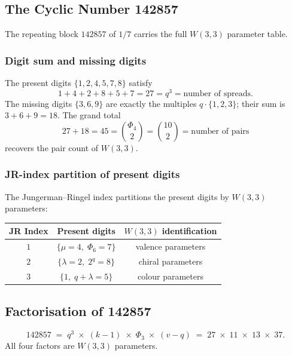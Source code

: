 \subsection{The Cyclic Number 142857}

The repeating block $142857$ of $1/7$ carries the full $W(3,3)$ parameter table.

\subsubsection*{Digit sum and missing digits}

The present digits $\{1, 2, 4, 5, 7, 8\}$ satisfy
\[
  1 + 4 + 2 + 8 + 5 + 7 = 27 = q^3 = \text{number of spreads}.
\]
The missing digits $\{3, 6, 9\}$ are exactly the multiples $q \cdot \{1, 2, 3\}$;
their sum is $3 + 6 + 9 = 18$.  The grand total
\[
  27 + 18 = 45 = \binom{\Phi_4}{2} = \binom{10}{2} = \text{number of pairs}
\]
recovers the pair count of $W(3,3)$.

\subsubsection*{JR-index partition of present digits}

The Jungerman--Ringel index partitions the present digits by $W(3,3)$ parameters:
\begin{center}
\begin{tabular}{ccc}
\hline
JR Index & Present digits & $W(3,3)$ identification \\ \hline
$1$ & $\{\mu = 4,\; \Phi_6 = 7\}$ & valence parameters \\
$2$ & $\{\lambda = 2,\; 2^q = 8\}$ & chiral parameters \\
$3$ & $\{1,\; q+\lambda = 5\}$ & colour parameters \\
\hline
\end{tabular}
\end{center}

\subsection{Factorisation of 142857}

\begin{theorem}
\[
  142857 \;=\; q^3 \;\times\; (k-1) \;\times\; \Phi_3 \;\times\; (v - q)
           \;=\; 27 \;\times\; 11 \;\times\; 13 \;\times\; 37.
\]
All four factors are $W(3,3)$ parameters.
\end{theorem}

